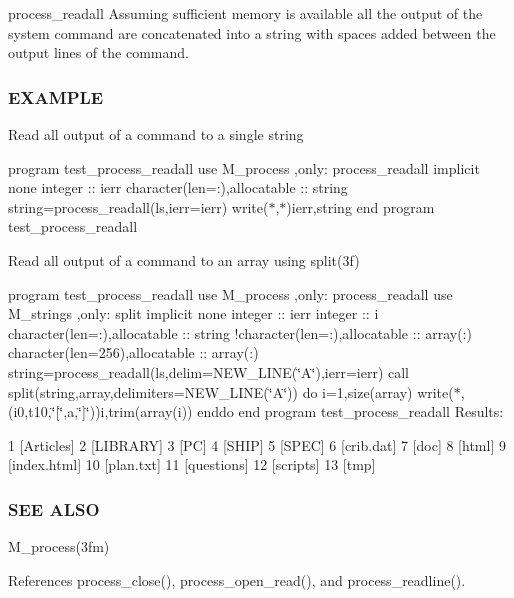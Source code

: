 process\+\_\+readall Assuming sufficient memory is available all the output of the system command are concatenated into a string with spaces added between the output lines of the command. \subsubsection*{E\+X\+A\+M\+P\+LE}

Read all output of a command to a single string

program test\+\_\+process\+\_\+readall use M\+\_\+process ,only\+: process\+\_\+readall implicit none integer \+:\+: ierr character(len=\+:),allocatable \+:\+: string string=process\+\_\+readall(\textquotesingle{}ls\textquotesingle{},ierr=ierr) write($\ast$,$\ast$)ierr,string end program test\+\_\+process\+\_\+readall

Read all output of a command to an array using split(3f)

program test\+\_\+process\+\_\+readall use M\+\_\+process ,only\+: process\+\_\+readall use M\+\_\+strings ,only\+: split implicit none integer \+:\+: ierr integer \+:\+: i character(len=\+:),allocatable \+:\+: string !character(len=\+:),allocatable \+:\+: array(\+:) character(len=256),allocatable \+:\+: array(\+:) string=process\+\_\+readall(\textquotesingle{}ls\textquotesingle{},delim=N\+E\+W\+\_\+\+L\+I\+NE(\char`\"{}\+A\char`\"{}),ierr=ierr) call split(string,array,delimiters=N\+E\+W\+\_\+\+L\+I\+NE(\char`\"{}\+A\char`\"{})) do i=1,size(array) write($\ast$,\textquotesingle{}(i0,t10,\char`\"{}\mbox{[}\char`\"{},a,\char`\"{}\mbox{]}\char`\"{})\textquotesingle{})i,trim(array(i)) enddo end program test\+\_\+process\+\_\+readall Results\+:

1 \mbox{[}Articles\mbox{]} 2 \mbox{[}L\+I\+B\+R\+A\+RY\mbox{]} 3 \mbox{[}PC\mbox{]} 4 \mbox{[}S\+H\+IP\mbox{]} 5 \mbox{[}S\+P\+EC\mbox{]} 6 \mbox{[}crib.\+dat\mbox{]} 7 \mbox{[}doc\mbox{]} 8 \mbox{[}html\mbox{]} 9 \mbox{[}index.\+html\mbox{]} 10 \mbox{[}plan.\+txt\mbox{]} 11 \mbox{[}questions\mbox{]} 12 \mbox{[}scripts\mbox{]} 13 \mbox{[}tmp\mbox{]}

\subsubsection*{S\+EE A\+L\+SO}

M\+\_\+process(3fm) 

References process\+\_\+close(), process\+\_\+open\+\_\+read(), and process\+\_\+readline().

\mbox{\label{namespacem__process_acbc72c5ed371430a471aa1f3010fbbda}} 
